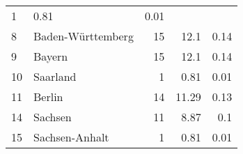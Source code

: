 \begin{longtable}{lXrrr}
       \num{1} &
       \num[round-mode=places,round-precision=2]{0,81} &
         \num[round-mode=places,round-precision=2]{0,01} \\

     8 &
     \multicolumn{1}{X}{ Baden-Württemberg   } &


       \num{15} &
       \num[round-mode=places,round-precision=2]{12,1} &
         \num[round-mode=places,round-precision=2]{0,14} \\

     9 &
     \multicolumn{1}{X}{ Bayern   } &


       \num{15} &
       \num[round-mode=places,round-precision=2]{12,1} &
         \num[round-mode=places,round-precision=2]{0,14} \\

     10 &
     \multicolumn{1}{X}{ Saarland   } &


       \num{1} &
       \num[round-mode=places,round-precision=2]{0,81} &
         \num[round-mode=places,round-precision=2]{0,01} \\

     11 &
     \multicolumn{1}{X}{ Berlin   } &


       \num{14} &
       \num[round-mode=places,round-precision=2]{11,29} &
         \num[round-mode=places,round-precision=2]{0,13} \\

     14 &
     \multicolumn{1}{X}{ Sachsen   } &


       \num{11} &
       \num[round-mode=places,round-precision=2]{8,87} &
         \num[round-mode=places,round-precision=2]{0,1} \\

     15 &
     \multicolumn{1}{X}{ Sachsen-Anhalt   } &


       \num{1} &
       \num[round-mode=places,round-precision=2]{0,81} &
         \num[round-mode=places,round-precision=2]{0,01} \\


\end{longtable}
